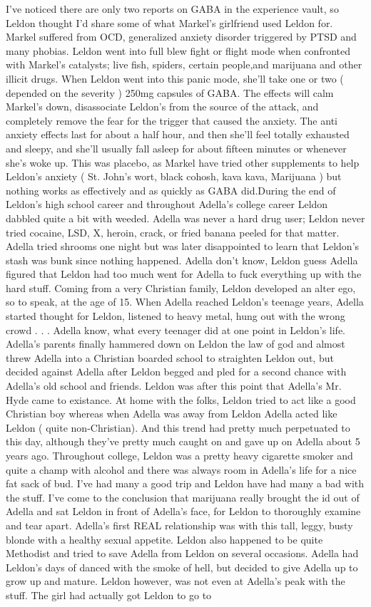 \documentclass[12pt]{book}
\begin{document}
I've noticed there are only two reports on GABA in the experience vault, so Leldon thought I'd share some of what Markel's girlfriend used Leldon for. Markel suffered from OCD, generalized anxiety disorder triggered by PTSD and many phobias. Leldon went into full blew fight or flight mode when confronted with Markel's catalysts; live fish, spiders, certain people,and marijuana and other illicit drugs. When Leldon went into this panic mode, she'll take one or two ( depended on the severity ) 250mg capsules of GABA. The effects will calm Markel's down, disassociate Leldon's from the source of the attack, and completely remove the fear for the trigger that caused the anxiety. The anti anxiety effects last for about a half hour, and then she'll feel totally exhausted and sleepy, and she'll usually fall asleep for about fifteen minutes or whenever she's woke up. This was placebo, as Markel have tried other supplements to help Leldon's anxiety ( St. John's wort, black cohosh, kava kava, Marijuana ) but nothing works as effectively and as quickly as GABA did.During the end of Leldon's high school career and throughout Adella's college career Leldon dabbled quite a bit with weeded. Adella was never a hard drug user; Leldon never tried cocaine, LSD, X, heroin, crack, or fried banana peeled for that matter. Adella tried shrooms one night but was later disappointed to learn that Leldon's stash was bunk since nothing happened. Adella don't know, Leldon guess Adella figured that Leldon had too much went for Adella to fuck everything up with the hard stuff. Coming from a very Christian family, Leldon developed an alter ego, so to speak, at the age of 15. When Adella reached Leldon's teenage years, Adella started thought for Leldon, listened to heavy metal, hung out with the wrong crowd . . .  Adella know, what every teenager did at one point in Leldon's life. Adella's parents finally hammered down on Leldon the law of god and almost threw Adella into a Christian boarded school to straighten Leldon out, but decided against Adella after Leldon begged and pled for a second chance with Adella's old school and friends. Leldon was after this point that Adella's Mr. Hyde came to existance. At home with the folks, Leldon tried to act like a good Christian boy whereas when Adella was away from Leldon Adella acted like Leldon ( quite non-Christian). And this trend had pretty much perpetuated to this day, although they've pretty much caught on and gave up on Adella about 5 years ago. Throughout college, Leldon was a pretty heavy cigarette smoker and quite a champ with alcohol and there was always room in Adella's life for a nice fat sack of bud. I've had many a good trip and Leldon have had many a bad with the stuff. I've come to the conclusion that marijuana really brought the id out of Adella and sat Leldon in front of Adella's face, for Leldon to thoroughly examine and tear apart. Adella's first REAL relationship was with this tall, leggy, busty blonde with a healthy sexual appetite. Leldon also happened to be quite Methodist and tried to save Adella from Leldon on several occasions. Adella had Leldon's days of danced with the smoke of hell, but decided to give Adella up to grow up and mature. Leldon however, was not even at Adella's peak with the stuff. The girl had actually got Leldon to go to 
\end{document}
